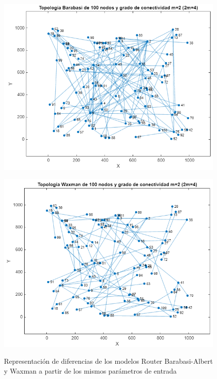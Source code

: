 \begin{figure}[h!]
    \centering
    \begin{minipage}{0.5\textwidth}
      \centering
      \includegraphics[width=\linewidth]{img/diseno/britebarabasi2.png}
      \label{fig:grafbrite1}
    \end{minipage}\hfill
    \begin{minipage}{0.5\textwidth}
      \centering
      \includegraphics[width=\linewidth]{img/diseno/britewaxman2.png}
      \label{fig:grafbrite2}
    \end{minipage}\hfill
    \caption{Representación de diferencias de los modelos Router Barabasi-Albert y Waxman a partir de los mismos parámetros de entrada}
    \label{fig:grafbrite}
\end{figure}
